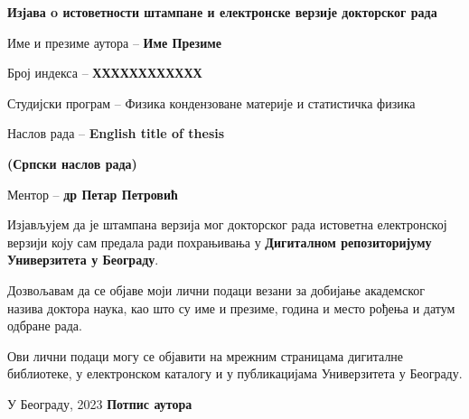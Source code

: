 \cleardoublepage

\thispagestyle{empty}
\setlength{\parindent}{0pt}
\renewcommand{\headrulewidth}{0pt}


\normalsize

\mbox{}
\vspace{1cm}

\begin{center}


\begin{Large}\textbf{Изјава o истоветности штампане и електронске верзије 
докторског рада 
}
\end{Large} 
\end{center}


\vspace{1cm}

Име и презиме аутора -- \textbf{Име Презиме}

Број индекса -- \textbf{ХХХХХХХХХХХХ}

Студијски програм --  Физика кондензоване материје и статистичка физика

Наслов рада -- 
{
\textbf{English title of thesis}}

\textbf{(Српски наслов рада)}

Ментор -- \textbf{др Петар Петровић}

Изјављујем  да  је  штампана  верзија  мог  докторског  рада  истоветна  
електронској верзији  коју  сам  предала  ради  похрањивања у \textbf{Дигиталном 
репозиторијуму Универзитета у Београду}. 

Дозвољавам да се објаве моји лични 
подаци везани за добијање академског назива доктора наука, као што су име и 
презиме, година и место рођења и датум одбране рада. 

Ови лични подаци могу се 
објавити на мрежним страницама дигиталне библиотеке, у електронском каталогу и 
у 
публикацијама Универзитета у Београду.
 

\vfill

У Београду, \hspace{1cm} 2023  \hfill  \textbf{Потпис
аутора\hspace{2cm}\mbox{}}

\vspace{.5cm}
\hspace{10cm}\hrulefill 


\hspace{\fill}
\pagebreak
\justify

